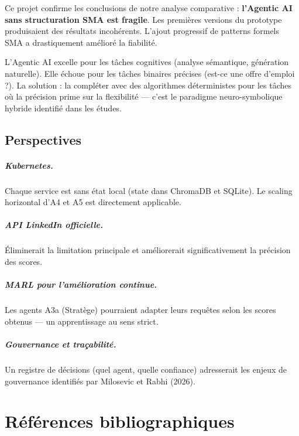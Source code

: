 \documentclass[12pt,a4paper]{report}
\begin{document}
Ce projet confirme les conclusions de notre analyse comparative : \textbf{l'Agentic
AI sans structuration SMA est fragile}. Les premières versions du prototype produisaient
des résultats incohérents. L'ajout progressif de patterns formels SMA a drastiquement
amélioré la fiabilité.

L'Agentic AI excelle pour les tâches cognitives (analyse sémantique, génération
naturelle). Elle échoue pour les tâches binaires précises (est-ce une offre
d'emploi ?). La solution : la compléter avec des algorithmes déterministes pour
les tâches où la précision prime sur la flexibilité --- c'est le paradigme
neuro-symbolique hybride identifié dans les études.

\section{Perspectives}

\paragraph{Kubernetes.}
Chaque service est sans état local (state dans ChromaDB et SQLite). Le scaling
horizontal d'A4 et A5 est directement applicable.

\paragraph{API LinkedIn officielle.}
Éliminerait la limitation principale et améliorerait significativement la précision
des scores.

\paragraph{MARL pour l'amélioration continue.}
Les agents A3a (Stratège) pourraient adapter leurs requêtes selon les scores
obtenus --- un apprentissage au sens strict.

\paragraph{Gouvernance et traçabilité.}
Un registre de décisions (quel agent, quelle confiance) adresserait les enjeux
de gouvernance identifiés par Milosevic et Rabhi (2026).

\chapter*{Références bibliographiques}
\end{document}
